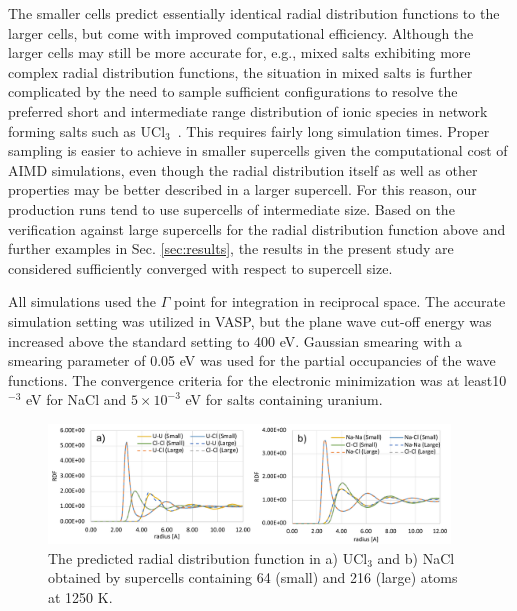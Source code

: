 \documentclass[titlepage=firstiscover,11pt,fleqn,headheight=14pt,footheight=40.8pt]{scrreprt}
\begin{document}
The smaller cells predict essentially identical radial distribution functions to the larger cells, but come with improved computational efficiency. %
Although the larger cells may still be more accurate for, e.g., mixed salts exhibiting more complex radial distribution functions, the situation in mixed salts is further complicated by the need to sample sufficient configurations to resolve the preferred short and intermediate range distribution of ionic species in network forming salts such as UCl$_3$~\cite{Li}. This requires fairly long simulation times. %
Proper sampling is easier to achieve in smaller supercells given the computational cost of AIMD simulations, even though the radial distribution itself as well as other properties may be better described in a larger supercell. For this reason, our production runs tend to use supercells of intermediate size.  Based on the verification against large supercells for the radial distribution function above and further examples in Sec. \ref{sec:results}, the results in the present study are considered sufficiently converged with respect to supercell size.

All simulations used the $\Gamma$ point for integration in reciprocal space. The accurate simulation setting was utilized in VASP, but the plane wave cut-off energy was increased above the standard setting to 400 eV. Gaussian smearing with a smearing parameter of 0.05 eV was used for the partial occupancies of the wave functions. The convergence criteria for the electronic minimization was at least10$^{-3}$ eV for NaCl and $5\times10^{-3}$ eV for salts containing uranium. 

\begin{figure}[htb]
\centering
\includegraphics[width=0.95\textwidth]{FIG1_0.pdf}
\caption{The predicted radial distribution function in a) UCl$_3$ and b) NaCl obtained by supercells containing 64 (small) and 216 (large) atoms at 1250 K.} 
\label{fig:radial}
\end{figure}
\end{document}
